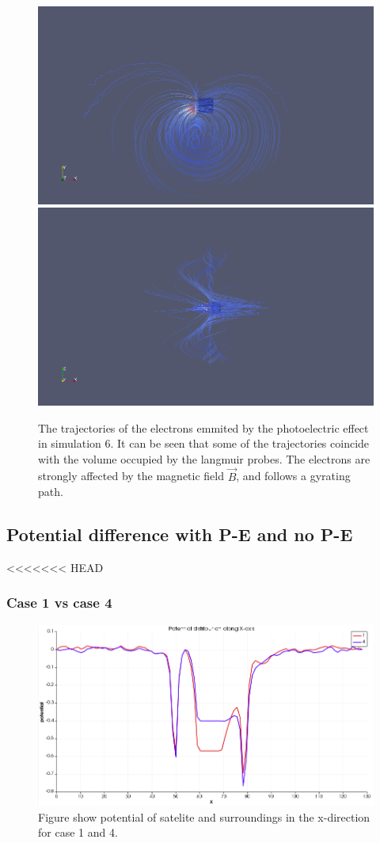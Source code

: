 	\begin{figure}
		\includegraphics[width = 0.49 \textwidth]{images/case6_jph_paths}
		\includegraphics[width = 0.49 \textwidth]{images/case6_jph_paths_2}
		\caption{The trajectories of the electrons emmited by the photoelectric effect in simulation \(6\). It can be seen that some
		of the trajectories coincide with the volume occupied by the langmuir probes. The electrons are strongly affected by the magnetic
		field \(\vec{B}\), and follows a gyrating path.}
 	\end{figure}


\subsection{Potential difference with P-E and no P-E}


<<<<<<< HEAD


\subsubsection{Case 1 vs case 4}

\begin{figure}
    \includegraphics[scale = 0.5 \textwidth]{potential_case1&4.png}
    \caption{Figure show potential of satelite and surroundings in the x-direction for case 1 and 4.}
\end{figure}


